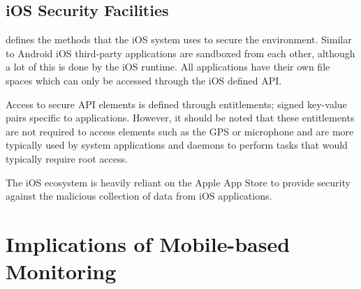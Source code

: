 \documentclass[12pt, a4paper]{article}
\begin{document}
\nocite{lockheimer2012android}

\subsection{iOS Security Facilities}
\cite{apple2012security} defines the methods that the iOS system uses to secure
the environment. Similar to Android iOS third-party applications are sandboxed 
from each other, although a lot of this is done by the iOS runtime. All
applications have their own file spaces which can only be accessed through the
iOS defined API.

Access to secure API elements is defined through entitlements; signed key-value
pairs specific to applications. However, it should be noted that these
entitlements are not required to access elements such as the GPS or microphone
and are more typically used by system applications and daemons to perform tasks
that would typically require root access.

The iOS ecosystem is heavily reliant on the Apple App
Store\cite{apple2013appstore} to provide security against the malicious
collection of data from iOS applications.




\newpage
\section{Implications of Mobile-based Monitoring}

\newpage


\end{document}
